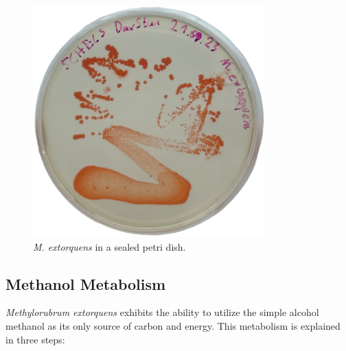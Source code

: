 \begin{figure}[H]
    \centering
    \includegraphics[width=0.8\textwidth]{./media/images/mextorquens_sealed}
    \caption{\emph{M. extorquens} in a sealed petri dish.}
    \label{fig:mextorquens_petri_sealed}
\end{figure}


\subsection{Methanol Metabolism\authorB}
\emph{Methylorubrum extorquens} exhibits the ability to utilize the simple alcohol methanol  as its only source of carbon and energy.
This metabolism is explained in three steps:

